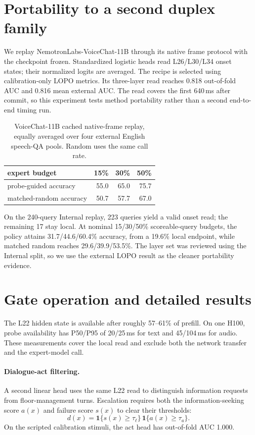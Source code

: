 

\section{Portability to a second duplex family}
\label{app:nvda}
We replay NemotronLabs-VoiceChat-11B through its native frame protocol with the
checkpoint frozen. Standardized logistic heads read L26/L30/L34 onset states;
their normalized logits are averaged. The recipe is selected using
calibration-only LOPO metrics. Its three-layer read reaches 0.818 out-of-fold
AUC and 0.816 mean external AUC. The read covers the first 640\,ms after commit,
so this experiment tests method portability rather than a second end-to-end
timing run.

\begin{table}[h]
\centering\small
\caption{VoiceChat-11B cached native-frame replay, equally averaged over four
external English speech-QA pools. Random uses the same call rate.}
\label{tab:nvda-summary}
\begin{tabular}{lrrr}
\toprule
expert budget & 15\% & 30\% & 50\% \\
\midrule
probe-guided accuracy & 55.0 & 65.0 & 75.7 \\
matched-random accuracy & 50.7 & 57.7 & 67.0 \\
\bottomrule
\end{tabular}
\end{table}

On the 240-query Internal replay, 223 queries yield a valid onset read; the
remaining 17 stay local. At nominal 15/30/50\% scoreable-query budgets, the
policy attains 31.7/44.6/60.4\% accuracy, from a 19.6\% local endpoint, while
matched random reaches 29.6/39.9/53.5\%. The layer set was reviewed using the
Internal split, so we use the external LOPO result as the cleaner portability
evidence.

\section{Gate operation and detailed results}
\label{app:gatedetail}
\label{app:livedetail}

The L22 hidden state is available after roughly 57--61\% of prefill. On one
H100, probe availability has P50/P95 of 20/25\,ms for text and 45/104\,ms for
audio. These measurements cover the local read and exclude both the network
transfer and the expert-model call.

\paragraph{Dialogue-act filtering.}
\label{app:actgate}
A second linear head uses the same L22 read to distinguish information requests
from floor-management turns. Escalation requires both the information-seeking
score $a(x)$ and failure score $s(x)$ to clear their thresholds:
\begin{equation}
d(x)=\mathbf{1}\{s(x)\geq\tau_\ell\}\,
     \mathbf{1}\{a(x)\geq\tau_a\}.
\end{equation}
On the scripted calibration stimuli, the act head has out-of-fold AUC 1.000.

